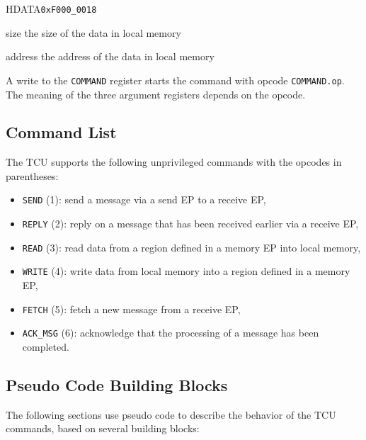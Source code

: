 \documentclass[a4paper,11pt]{article}
\begin{document}
\begin{register}{H}{DATA}{\texttt{0xF000\_0018}}
  \regnewline%
  \begin{regdesc}\begin{reglist}
    \item[size] the size of the data in local memory
    \item[address] the address of the data in local memory
  \end{reglist}\end{regdesc}
\end{register}

\noindent A write to the \texttt{COMMAND} register starts the command with opcode
\texttt{COMMAND.op}. The meaning of the three argument registers depends on the opcode.

\subsection{Command List}

The TCU supports the following unprivileged commands with the opcodes in parentheses:

\begin{itemize}
  \item \texttt{SEND} (1): send a message via a send EP to a receive EP,
  \item \texttt{REPLY} (2): reply on a message that has been received earlier via a receive EP,
  \item \texttt{READ} (3): read data from a region defined in a memory EP into local memory,
  \item \texttt{WRITE} (4): write data from local memory into a region defined in a memory EP,
  \item \texttt{FETCH} (5): fetch a new message from a receive EP,
  \item \texttt{ACK\_MSG} (6): acknowledge that the processing of a message has been completed.
\end{itemize}

\subsection{Pseudo Code Building Blocks}

The following sections use pseudo code to describe the behavior of the TCU commands, based on
several building blocks:
\end{document}
